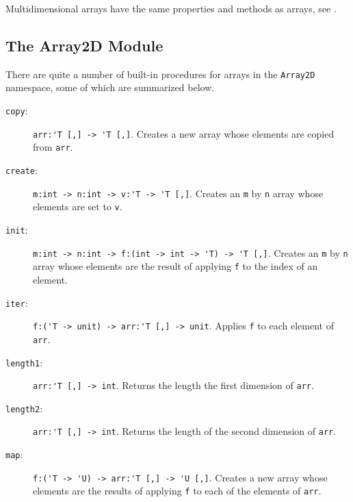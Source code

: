 Multidimensional arrays have the same properties and methods as arrays, see .

\subsection{The Array2D Module}
There are quite a number of built-in procedures for arrays in the \lstinline{Array2D} namespace, some of which are summarized below.
\begin{description}
\item[\texttt{copy}:] \lstinline{arr:'T [,] -> 'T [,]}. Creates a new array whose elements are copied from \lstinline{arr}.
\item[\texttt{create}:] \lstinline{m:int -> n:int -> v:'T -> 'T [,]}. Creates an \lstinline{m} by \lstinline{n} array whose elements are set to \lstinline{v}.
\item[\texttt{init}:] \lstinline{m:int -> n:int -> f:(int -> int -> 'T) -> 'T [,]}. Creates an \lstinline{m} by \lstinline{n} array whose elements are the result of applying \lstinline{f} to the index of an element.
\item[\texttt{iter}:] \lstinline{f:('T -> unit) -> arr:'T [,] -> unit}. Applies \lstinline{f} to each element of \lstinline{arr}.
\item[\texttt{length1}:] \lstinline{arr:'T [,] -> int}. Returns the length the first dimension of \lstinline{arr}.
\item[\texttt{length2}:] \lstinline{arr:'T [,] -> int}. Returns the length of the second dimension of \lstinline{arr}.
\item[\texttt{map}:] \lstinline{f:('T -> 'U) -> arr:'T [,] -> 'U [,]}. Creates a new array whose elements are the results of applying \lstinline{f} to each of the elements of \lstinline{arr}.
\end{description}

